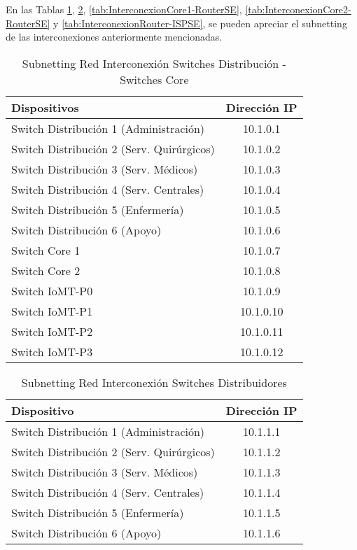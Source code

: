 En las Tablas \ref{tab:InterconexionCoreSE}, \ref{tab:InterconexionDistrSE}, \ref{tab:InterconexionCore1-RouterSE}, \ref{tab:InterconexionCore2-RouterSE} y \ref{tab:InterconexionRouter-ISPSE},
se pueden apreciar el subnetting de las interconexiones anteriormente mencionadas.
\renewcommand{\arraystretch}{1.5}
\begin{table}[H]
    \centering
    \scriptsize
    \begin{tabular}{|l|c|}
        \hline
        \textbf{Dispositivos} & \textbf{Dirección IP} \\
        \hline
        Switch Distribución 1 (Administración) & 10.1.0.1 \\
        \hline
        Switch Distribución 2 (Serv. Quirúrgicos) & 10.1.0.2 \\
        \hline
        Switch Distribución 3 (Serv. Médicos) & 10.1.0.3 \\
        \hline
        Switch Distribución 4 (Serv. Centrales) & 10.1.0.4 \\
        \hline
        Switch Distribución 5 (Enfermería) & 10.1.0.5 \\
        \hline
        Switch Distribución 6 (Apoyo) & 10.1.0.6 \\
        \hline
        Switch Core 1 & 10.1.0.7 \\
        \hline
        Switch Core 2 & 10.1.0.8 \\
        \hline
        Switch IoMT-P0 & 10.1.0.9 \\
        \hline
        Switch IoMT-P1 & 10.1.0.10 \\
        \hline
        Switch IoMT-P2 & 10.1.0.11 \\
        \hline
        Switch IoMT-P3 & 10.1.0.12 \\
        \hline
    \end{tabular}
    \caption{Subnetting Red Interconexión Switches Distribución - Switches Core}
    \label{tab:InterconexionCoreSE}
\end{table}

\begin{table}[H]
    \centering
    \scriptsize
    \begin{tabular}{|l|c|}
        \hline
        \textbf{Dispositivo} & \textbf{Dirección IP} \\
        \hline
        Switch Distribución 1 (Administración) & 10.1.1.1 \\
        \hline
        Switch Distribución 2 (Serv. Quirúrgicos) & 10.1.1.2 \\
        \hline
        Switch Distribución 3 (Serv. Médicos) & 10.1.1.3 \\
        \hline
        Switch Distribución 4 (Serv. Centrales) & 10.1.1.4 \\
        \hline
        Switch Distribución 5 (Enfermería) & 10.1.1.5 \\
        \hline
        Switch Distribución 6 (Apoyo) & 10.1.1.6 \\
        \hline
    \end{tabular}
    \caption{Subnetting Red Interconexión Switches Distribuidores}
    \label{tab:InterconexionDistrSE}
\end{table}

